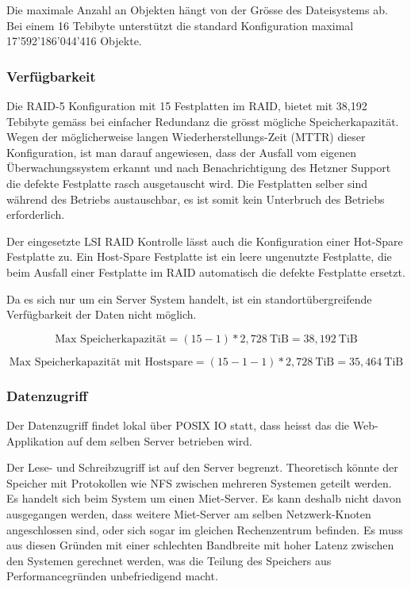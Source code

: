 Die maximale Anzahl an Objekten hängt von der Grösse des Dateisystems ab. Bei einem 16 Tebibyte unterstützt die standard Konfiguration maximal 17'592'186'044'416 Objekte. 

\subsubsection*{Verfügbarkeit}
Die RAID-5 Konfiguration mit 15 Festplatten im RAID, bietet mit 38,192 Tebibyte gemäss  bei einfacher Redundanz die grösst mögliche Speicherkapazität. Wegen der möglicherweise langen Wiederherstellungs-Zeit (MTTR) dieser Konfiguration, ist man darauf angewiesen, dass der Ausfall vom eigenen Überwachungssystem erkannt und nach Benachrichtigung des Hetzner Support die defekte Festplatte rasch ausgetauscht wird. Die Festplatten selber sind während des Betriebs austauschbar, es ist somit kein Unterbruch des Betriebs erforderlich.

Der eingesetzte LSI RAID Kontrolle lässt auch die Konfiguration einer Hot-Spare Festplatte zu. Ein Host-Spare Festplatte ist ein leere ungenutzte Festplatte, die beim Ausfall einer Festplatte im RAID automatisch die defekte Festplatte ersetzt. 

Da es sich nur um ein Server System handelt, ist ein standortübergreifende Verfügbarkeit der Daten nicht möglich.


\begin{equation}
\mbox{Max Speicherkapazität} = (15 -1)* 2,728 \mathrm{\ TiB}= 38,192 \mathrm{\ TiB}
\label{eqn:MaxSpeicherkapazitätHeztner}
\end{equation}

\begin{equation}
\mbox{Max Speicherkapazität mit Hostspare} = (15 -1-1)* 2,728 \mathrm{\ TiB}= 35,464 \mathrm{\ TiB}
\label{eqn:MaxSpeicherkapazitätHeztnerHotspare}
\end{equation}

\subsubsection*{Datenzugriff}
Der Datenzugriff findet lokal über POSIX IO statt, dass heisst das die Web-Applikation auf dem selben Server betrieben wird. 

Der Lese- und Schreibzugriff ist auf den Server begrenzt. Theoretisch könnte der Speicher mit Protokollen wie NFS zwischen mehreren Systemen geteilt werden. Es handelt sich beim System um einen Miet-Server. Es kann deshalb nicht davon ausgegangen werden, dass weitere Miet-Server am selben Netzwerk-Knoten angeschlossen sind, oder sich sogar im gleichen Rechenzentrum befinden. Es muss aus diesen Gründen mit einer schlechten Bandbreite mit hoher Latenz zwischen den Systemen gerechnet werden, was die Teilung des Speichers aus Performancegründen unbefriedigend macht.

